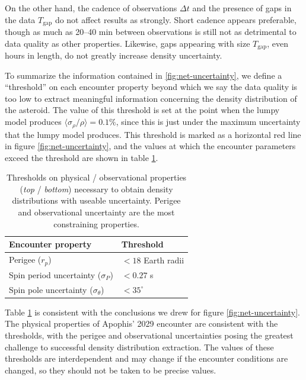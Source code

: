 \documentclass[fleqn,usenatbib]{mnras}
\begin{document}
On the other hand, the cadence of observations $\Delta t$ and the presence of gaps in the data $T_\text{gap}$ do not affect results as strongly. Short cadence appears preferable, though as much as 20--40 min between observations is still not as detrimental to data quality as other properties. Likewise, gaps appearing with size $T_\text{gap}$, even hours in length, do not greatly increase density uncertainty. 

To summarize the information contained in \ref{fig:net-uncertainty}, we define a ``threshold'' on each encounter property beyond which we say the data quality is too low to extract meaningful information concerning the density distribution of the asteroid. The value of this threshold is set at the point when the lumpy model produces $\langle \sigma_\rho / \rho \rangle = 0.1\%$, since this is just under the maximum uncertainty that the lumpy model produces. This threshold is marked as a horizontal red line in figure \ref{fig:net-uncertainty}, and the values at which the encounter parameters exceed the threshold are shown in table \ref{tab:threshold-summary}.

\begin{table}
  \centering
  \begin{tabular}{ll} \hline
    Encounter property & Threshold \\ \hline
    Perigee ($r_p$) & $<18$ Earth radii\\ \hline
    Spin period uncertainty ($\sigma_P$) & $<0.27$ s\\
    Spin pole uncertainty ($\sigma_\theta$) & $< 35^\circ$ \\
    \hline
  \end{tabular}
  \caption{Thresholds on physical / observational properties (\textit{top} / \textit{bottom}) necessary to obtain density distributions with useable uncertainty. Perigee and observational uncertainty are the most constraining properties.}
  \label{tab:threshold-summary}
\end{table}

Table \ref{tab:threshold-summary} is consistent with the conclusions we drew for figure \ref{fig:net-uncertainty}. The physical properties of Apophis' 2029 encounter are consistent with the thresholds, with the perigee and observational uncertainties posing the greatest challenge to successful density distribution extraction. The values of these thresholds are interdependent and may change if the encounter conditions are changed, so they should not be taken to be precise values.
\end{document}
